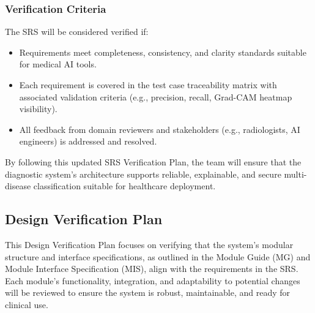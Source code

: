 \documentclass[12pt, titlepage]{article}
\begin{document}
\subsubsection{Verification Criteria}
The SRS will be considered verified if:
\begin{itemize}
  \item Requirements meet completeness, consistency, and clarity standards suitable for medical AI tools.
  \item Each requirement is covered in the test case traceability matrix with associated validation criteria (e.g., precision, recall, Grad-CAM heatmap visibility).
  \item All feedback from domain reviewers and stakeholders (e.g., radiologists, AI engineers) is addressed and resolved.
\end{itemize}

By following this updated SRS Verification Plan, the team will ensure that the diagnostic system's architecture supports reliable, explainable, and secure multi-disease classification suitable for healthcare deployment.


\subsection{Design Verification Plan}


This Design Verification Plan focuses on verifying that the system's modular structure and interface specifications, as outlined in the Module Guide (MG) and Module Interface Specification (MIS), align with the requirements in the SRS. Each module's functionality, integration, and adaptability to potential changes will be reviewed to ensure the system is robust, maintainable, and ready for clinical use.
\end{document}
